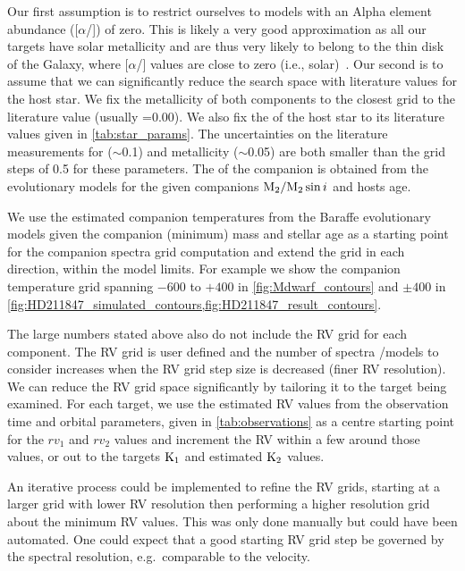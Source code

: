 Our first assumption is to restrict ourselves to models with an Alpha element abundance ([\(\alpha\)/]) of zero.
This is likely a very good approximation as all our targets have solar metallicity and are thus very likely to belong to the thin disk of the Galaxy, where [\(\alpha\)/] values are close to zero (i.e., solar)~\citet[e.g.]{adibekyan_chemical_2012}.
Our second is to assume that we can significantly reduce the search space with literature values for the host star.
We fix the metallicity of both components to the closest grid to the literature value (usually \feh{}=0.00).
We also fix the \logg{} of the host star to its literature values given in \cref{tab:star_params}.
The uncertainties on the literature measurements for \logg{} (\(\sim\)0.1) and metallicity (\(\sim\)0.05) are both smaller than the grid steps of 0.5 for these parameters.
The \logg{} of the companion is obtained from the~\citet{baraffe_evolutionary_2003,baraffe_new_2015} evolutionary models for the given companions \(\textrm{M}_{2}/\textrm{M}_{2}\sin{i}\) and hosts age.

We use the estimated companion temperatures from the Baraffe evolutionary models given the companion (minimum) mass and stellar age as a starting point for the companion spectra grid computation and extend the grid in each direction, within the model limits.
For example we show the companion temperature grid spanning \(-600\) to \(+400\)\K{} in \cref{fig:Mdwarf_contours} and \(\pm400\)\K{} in \cref{fig:HD211847_simulated_contours,fig:HD211847_result_contours}.

The large numbers stated above also do not include the {RV} grid for each component.
The {RV} grid is user defined and the number of spectra /models to consider increases when the {RV} grid step size is decreased (finer {RV} resolution).
We can reduce the {RV} grid space significantly by tailoring it to the target being examined.
For each target, we use the estimated {RV} values from the observation time and orbital parameters, given in \cref{tab:observations} as a centre starting point for the \({rv}_1\) and \({rv}_2\) values and increment the {RV} within a few {\fwhm} around those values, or out to the targets \(\rm K_1\) and estimated \(\rm K_2\) values.

An iterative process could be implemented to refine the {RV} grids, starting at a larger grid with lower {RV} resolution then performing a higher resolution grid about the minimum \textchisquared{} {RV} values.
This was only done manually but could have been automated.
One could expect that a good starting {RV} grid step be governed by the spectral resolution, e.g.\ comparable to the {\fwhm} velocity.

